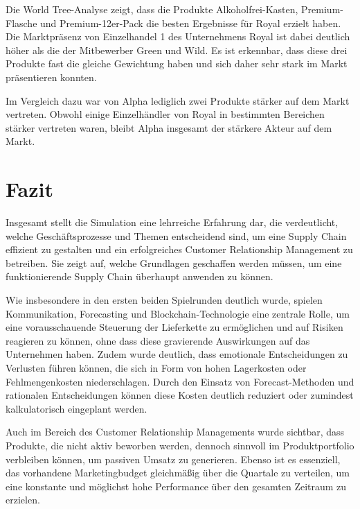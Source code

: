 \documentclass[a4paper,12pt]{article}
\begin{document}
Die World Tree-Analyse zeigt, dass die Produkte Alkoholfrei-Kasten,
Premium-Flasche und Premium-12er-Pack die besten Ergebnisse für Royal erzielt haben.
Die Marktpräsenz von Einzelhandel 1 des Unternehmens Royal ist dabei deutlich höher als die der
Mitbewerber Green und Wild. Es ist erkennbar,
dass diese drei Produkte fast die gleiche Gewichtung haben und sich daher sehr
stark im Markt präsentieren konnten.

Im Vergleich dazu war von Alpha lediglich zwei Produkte stärker auf dem Markt vertreten.
Obwohl einige Einzelhändler von Royal in bestimmten Bereichen stärker vertreten waren,
bleibt Alpha insgesamt der stärkere Akteur auf dem Markt.


\section{Fazit}
Insgesamt stellt die Simulation eine lehrreiche Erfahrung dar,
die verdeutlicht, welche Geschäftsprozesse und Themen entscheidend sind,
um eine Supply Chain effizient zu gestalten und ein erfolgreiches Customer Relationship Management
zu betreiben. Sie zeigt auf, welche Grundlagen geschaffen werden müssen,
um eine funktionierende Supply Chain überhaupt anwenden zu können.

Wie insbesondere in den ersten beiden Spielrunden deutlich wurde,
spielen Kommunikation, Forecasting und Blockchain-Technologie eine zentrale Rolle,
um eine vorausschauende Steuerung der Lieferkette zu ermöglichen und auf Risiken reagieren zu können,
ohne dass diese gravierende Auswirkungen auf das Unternehmen haben. Zudem wurde deutlich,
dass emotionale Entscheidungen zu Verlusten führen können,
die sich in Form von hohen Lagerkosten oder Fehlmengenkosten niederschlagen.
Durch den Einsatz von Forecast-Methoden und rationalen Entscheidungen können diese Kosten deutlich
reduziert oder zumindest kalkulatorisch eingeplant werden.

Auch im Bereich des Customer Relationship Managements wurde sichtbar,
dass Produkte, die nicht aktiv beworben werden, dennoch sinnvoll im Produktportfolio verbleiben können,
um passiven Umsatz zu generieren. Ebenso ist es essenziell,
das vorhandene Marketingbudget gleichmäßig über die Quartale zu verteilen,
um eine konstante und möglichst hohe Performance über den gesamten Zeitraum zu erzielen.
\newpage
{}
\end{document}
